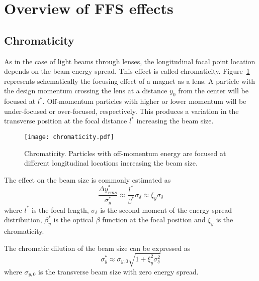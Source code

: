 \section{Overview of FFS effects}
\subsection{Chromaticity}
As in the case of light beams through lenses, the longitudinal focal point location depends on the beam energy spread. This effect is called chromaticity.  Figure~\ref{f:chrom} represents schematically the focusing effect of a magnet as a lens. A particle with the design momentum crossing the lens at a distance $y_0$ from the center will be focused at $l^*$. Off-momentum particles with higher or lower momentum will be under-focused or over-focused, respectively. This produces a variation in the transverse position at the focal distance $l^*$ increasing the beam size.\par
\begin{figure}[!hbt]
\centering
\texttt{[image: chromaticity.pdf]}\caption{Chromaticity. Particles with off-momentum energy are focused at different longitudinal locations increasing the beam size.}\label{f:chrom}
\end{figure}
The effect on the beam size is commonly estimated as
\begin{equation}
 \frac{\Delta y^*_{rms}}{\sigma^*_y}\approx\frac{l^*}{\beta^*}\sigma_\delta\approx\xi_y\sigma_\delta
\end{equation}
where $l^*$ is the focal length, $\sigma_\delta$ is the second moment of the energy spread distribution, $\beta_y^*$ is the optical $\beta$ function at the focal position and $\xi_y$ is the chromaticity.\par
The chromatic dilution of the beam size can be expressed as 
\begin{equation}
 \sigma^*_y\approx\sigma_{y,0}\sqrt{1+\xi_y^2\sigma^2_\delta}
\end{equation}
where $\sigma_{y,0}$ is the transverse beam size with zero energy spread.\par
